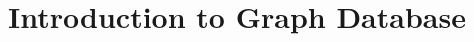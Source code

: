 \documentclass[xcolor=dvipsnames,compress,t,pdf,9pt]{beamer}
\title[\insertframenumber /\inserttotalframenumber]{Introduction to Graph Database}
\begin{document}
	\begin{frame}
	\titlepage
	\end{frame}
	
	
	
\end{document}

